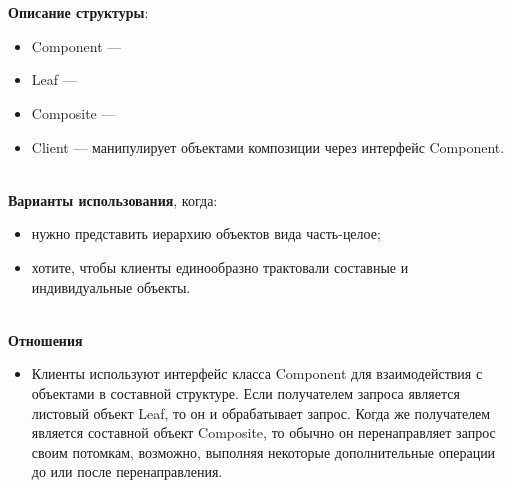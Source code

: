 \documentclass[a3paper,11pt]{report}
\def \boxSize {7cm}
\def \sboxSize {5cm}
\renewcommand{\unidirectionalAssociation}[4]{
	\draw [umlcd style, ->, umlcdNS] (#1) -- (#4)
	node[near end, above]{#2}
	node[near end, below]{#3};
}
\newcommand{\umlnoteND}[6]{
	\node[umlcd style, anchor=north, draw, shape=umlcdnote, text width=#2] at (#1) (note) {#3};
	\draw [umlcd style dashed line , ] (note.#4) ++(#5) --++(#6) coordinate(tmp) node[circle,inner sep=0pt,draw, fill=black!1, minimum size=5pt] (NoD) { };
}
\newcommand\tab[1][1cm]{\hspace*{#1}}
\begin{document}
\\\\
\textbf{Описание структуры}:
\begin{itemize}
\item Component --- 
\item Leaf --- 
\item Composite ---
\item Client --- манипулирует объектами композиции через интерфейс Component.
\end{itemize}

\large\textbf{\\Варианты использования}, когда:
\begin{itemize}
\item нужно представить иерархию объектов вида часть-целое;
\item хотите, чтобы клиенты единообразно трактовали составные и индивидуальные объекты.
\end{itemize}

\textbf{\\Отношения}
\begin{itemize}
\item Клиенты используют интерфейс класса Component для взаимодействия с объектами в составной структуре. Если получателем запроса является листовый объект Leaf, то он и обрабатывает запрос. Когда же получателем является составной объект Composite, то обычно он перенаправляет запрос своим потомкам, возможно, выполняя некоторые дополнительные операции до или после перенаправления.
\end{itemize}
\end{document}
